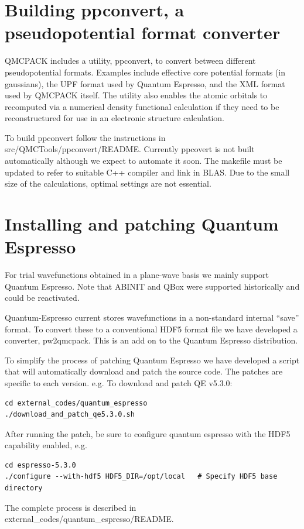 \section{Building ppconvert, a pseudopotential format converter}
\label{sec:buildppconvert}
QMCPACK includes a utility, ppconvert, to convert between different
pseudopotential formats. Examples include effective core potential
formats (in gaussians), the UPF format used by Quantum Espresso, and
the XML format used by QMCPACK itself. The utility also enables the
atomic orbitals to recomputed via a numerical density functional
calculation if they need to be reconstructured for use in an
electronic structure calculation.

To build ppconvert follow the instructions in
src/QMCTools/ppconvert/README. Currently ppcovert is not built
automatically although we expect to automate it soon. The makefile
must be updated to refer to suitable C++ compiler and link in
BLAS. Due to the small size of the calculations, optimal settings are
not essential.

\section{Installing and patching Quantum Espresso}
\label{sec:buildqe}
For trial wavefunctions obtained in a plane-wave basis we mainly
support Quantum Espresso. Note that ABINIT and QBox were supported historically
and could be reactivated.

Quantum-Espresso current stores wavefunctions in a non-standard internal
``save'' format. To convert these to a conventional HDF5 format file
we have developed a converter, pw2qmcpack. This is an add on to the
Quantum Espresso distribution.

To simplify the process of patching Quantum Espresso we have developed
a script that will automatically download and patch the source
code. The patches are specific to each version. e.g. To download and
patch QE v5.3.0:
\begin{verbatim}
cd external_codes/quantum_espresso
./download_and_patch_qe5.3.0.sh
\end{verbatim}
After running the patch, be sure to configure quantum espresso with
the HDF5 capability enabled, e.g.
\begin{verbatim}
cd espresso-5.3.0
./configure --with-hdf5 HDF5_DIR=/opt/local   # Specify HDF5 base directory
\end{verbatim}

The complete process is described in external\_codes/quantum\_espresso/README.


